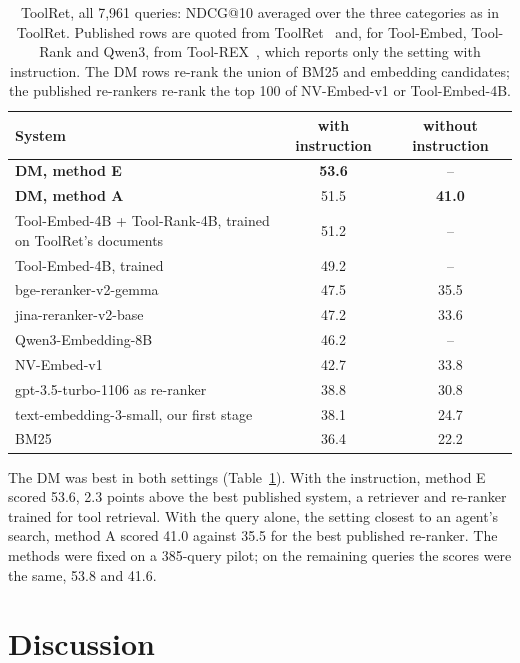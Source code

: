 \documentclass[11pt]{article}
\begin{document}
\begin{table}[t]
\centering\small
\caption{ToolRet, all 7{,}961 queries: NDCG@10 averaged over the three categories as in ToolRet. Published rows are
quoted from ToolRet~\citep{shi2025toolret} and, for Tool-Embed, Tool-Rank and Qwen3, from
Tool-REX~\citep{lu2026toolrex}, which reports only the setting with instruction. The DM rows re-rank the union of BM25
and embedding candidates; the published re-rankers re-rank the top 100 of NV-Embed-v1 or Tool-Embed-4B.}
\label{tab:toolret}
\setlength{\tabcolsep}{6pt}
\begin{tabular}{@{}lcc@{}}
\toprule
System & with instruction & without instruction \\
\midrule
\textbf{DM, method E} & \textbf{53.6} & -- \\
\textbf{DM, method A} & 51.5 & \textbf{41.0} \\
Tool-Embed-4B + Tool-Rank-4B, trained on ToolRet's documents & 51.2 & -- \\
Tool-Embed-4B, trained & 49.2 & -- \\
bge-reranker-v2-gemma & 47.5 & 35.5 \\
jina-reranker-v2-base & 47.2 & 33.6 \\
Qwen3-Embedding-8B & 46.2 & -- \\
NV-Embed-v1 & 42.7 & 33.8 \\
gpt-3.5-turbo-1106 as re-ranker & 38.8 & 30.8 \\
text-embedding-3-small, our first stage & 38.1 & 24.7 \\
BM25 & 36.4 & 22.2 \\
\bottomrule
\end{tabular}
\end{table}

The DM was best in both settings (Table~\ref{tab:toolret}). With the instruction, method E scored 53.6, 2.3 points
above the best published system, a retriever and re-ranker trained for tool retrieval. With the query alone, the
setting closest to an agent's search, method A scored 41.0 against 35.5 for the best published re-ranker. The methods
were fixed on a 385-query pilot; on the remaining queries the scores were the same, 53.8 and 41.6.

\section{Discussion}\label{sec:discussion}
\end{document}
